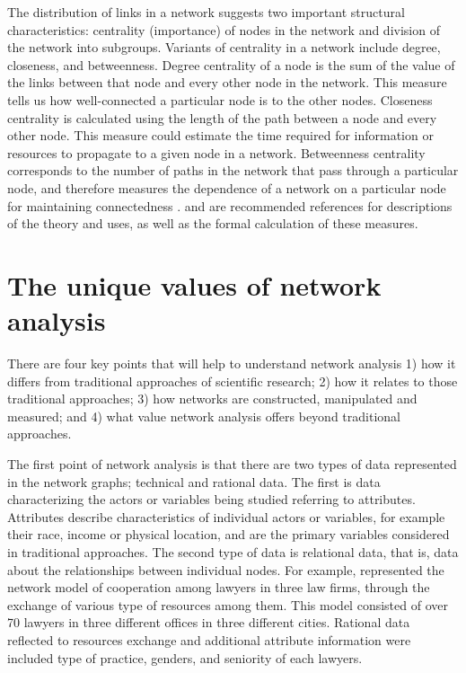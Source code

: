 The distribution of links in a network suggests two important structural characteristics: centrality (importance) of nodes in the network and division of the network into subgroups. Variants of centrality in a network include degree, closeness, and betweenness. Degree centrality of a node is the sum of the value of the links between that node and every other node in the network. This measure tells us how well-connected a particular node is to the other nodes. Closeness centrality is calculated using the length of the path between a node and every other node. This measure could estimate the time required for information or resources to propagate to a given node in a network. Betweenness centrality corresponds to the number of paths in the network that pass through a particular node, and therefore measures the dependence of a network on a particular node for maintaining connectedness \citep{Toubiana:2013cv}. \citet{Deng:2012do, newman2003structure} and \citet{Toubiana:2013cv} are recommended references for descriptions of the theory and uses, as well as the formal calculation of these measures.


\section*{The unique values of network analysis}

There are four key points that will help to understand network analysis 1) how it differs from traditional approaches of scientific research; 2) how it relates to those traditional approaches; 3) how networks are constructed, manipulated and measured; and 4) what value network analysis offers beyond traditional approaches.

The first point of network analysis is that there are two types of data represented in the network graphs; technical and rational data. The first is data characterizing the actors or variables being studied referring to attributes. Attributes describe characteristics of individual actors or variables, for example their race, income or physical location, and are the primary variables considered in traditional approaches. The second type of data is relational data, that is, data about the relationships between individual nodes. For example, \citet{Lazega} represented the network model of cooperation among lawyers in three law firms, through the exchange of various type of resources among them. This model consisted of over 70 lawyers in three different offices in three different cities. Rational data reflected to resources exchange and additional attribute information were included type of practice, genders, and seniority of each lawyers.


